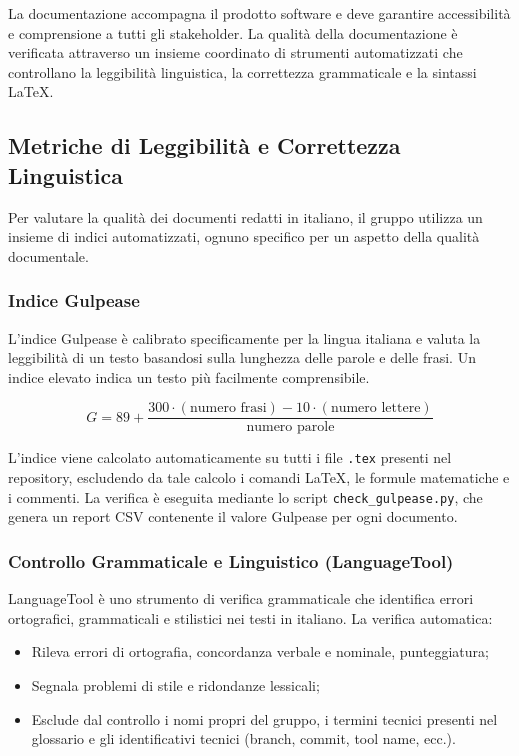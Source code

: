 \documentclass[a4paper,11pt,oneside]{scrartcl}
\begin{document}
La documentazione accompagna il prodotto software e deve garantire accessibilità e comprensione a tutti gli stakeholder{\scriptsize{}}. La qualità della documentazione è verificata attraverso un insieme coordinato di strumenti automatizzati che controllano la leggibilità linguistica, la correttezza grammaticale e la sintassi \LaTeX.

\subsection{Metriche di Leggibilità e Correttezza Linguistica}

Per valutare la qualità dei documenti redatti in italiano, il gruppo utilizza un insieme di indici automatizzati, ognuno specifico per un aspetto della qualità documentale.

\subsubsection{Indice Gulpease}

L'indice Gulpease{\scriptsize{}} è calibrato specificamente per la lingua italiana e valuta la leggibilità di un testo basandosi sulla lunghezza delle parole e delle frasi. Un indice elevato indica un testo più facilmente comprensibile.

\[
G = 89 + \frac{300 \cdot (\text{numero frasi}) - 10 \cdot (\text{numero lettere})}{\text{numero parole}}
\]

L'indice viene calcolato automaticamente su tutti i file \texttt{.tex} presenti nel repository{\scriptsize{}}, escludendo da tale calcolo i comandi \LaTeX{}{\scriptsize{}}, le formule matematiche e i commenti. La verifica è eseguita mediante lo script \texttt{check\_gulpease.py}, che genera un report CSV contenente il valore Gulpease per ogni documento.

\subsubsection{Controllo Grammaticale e Linguistico (LanguageTool)}

LanguageTool è uno strumento di verifica grammaticale che identifica errori ortografici, grammaticali e stilistici nei testi in italiano. La verifica automatica:

\begin{itemize}
    \item Rileva errori di ortografia, concordanza verbale e nominale, punteggiatura;
    \item Segnala problemi di stile e ridondanze lessicali;
    \item Esclude dal controllo i nomi propri del gruppo, i termini tecnici presenti nel glossario e gli identificativi tecnici (branch, commit, tool name, ecc.).
\end{itemize}
\end{document}
